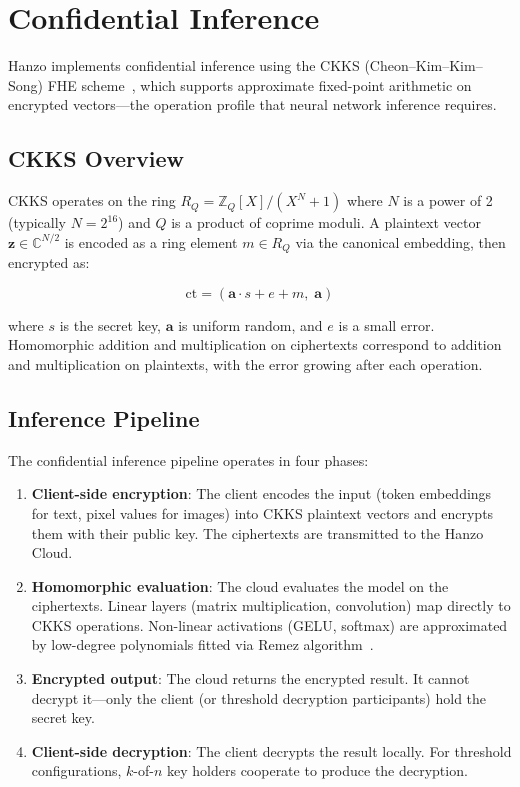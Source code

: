 \section{Confidential Inference}

\label{sec:fhe}

Hanzo implements confidential inference using the CKKS (Cheon--Kim--Kim--Song)
FHE scheme~\cite{ckks2017}, which supports approximate fixed-point arithmetic
on encrypted vectors---the operation profile that neural network inference
requires.

\subsection{CKKS Overview}

CKKS operates on the ring $R_Q = \mathbb{Z}_Q[X]/(X^N + 1)$ where $N$ is a
power of 2 (typically $N = 2^{16}$) and $Q$ is a product of coprime moduli.
A plaintext vector $\bm{z} \in \mathbb{C}^{N/2}$ is encoded as a ring
element $m \in R_Q$ via the canonical embedding, then encrypted as:

\begin{equation}
\text{ct} = (\bm{a} \cdot s + e + m, \; \bm{a})
\end{equation}

where $s$ is the secret key, $\bm{a}$ is uniform random, and $e$ is a small
error. Homomorphic addition and multiplication on ciphertexts correspond to
addition and multiplication on plaintexts, with the error growing after each
operation.

\subsection{Inference Pipeline}

The confidential inference pipeline operates in four phases:

\begin{enumerate}[leftmargin=1.4em]
    \item \textbf{Client-side encryption}: The client encodes the input (token
    embeddings for text, pixel values for images) into CKKS plaintext vectors
    and encrypts them with their public key. The ciphertexts are transmitted
    to the Hanzo Cloud.
    \item \textbf{Homomorphic evaluation}: The cloud evaluates the model on
    the ciphertexts. Linear layers (matrix multiplication, convolution) map
    directly to CKKS operations. Non-linear activations (GELU, softmax) are
    approximated by low-degree polynomials fitted via Remez
    algorithm~\cite{hanzocandle, hanzofhe}.
    \item \textbf{Encrypted output}: The cloud returns the encrypted result.
    It cannot decrypt it---only the client (or threshold decryption
    participants) hold the secret key.
    \item \textbf{Client-side decryption}: The client decrypts the result
    locally. For threshold configurations, $k$-of-$n$ key holders cooperate
    to produce the decryption.
\end{enumerate}

